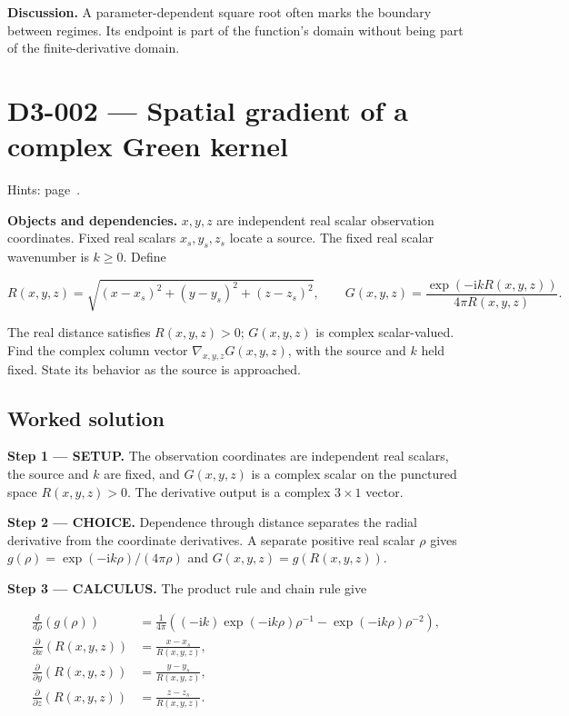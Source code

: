 \documentclass[11pt,oneside,openany]{book}
\begin{document}
\textbf{Discussion.} A parameter-dependent square root often marks the boundary between regimes. Its endpoint is part of the function's domain without being part of the finite-derivative domain.
\clearpage
\section{D3-002 --- Spatial gradient of a complex Green kernel}
\label{problem:D3-002}
{\small Hints: page~\pageref{hints:D3-002}.}\par\medskip

\textbf{Objects and dependencies.} \(x,y,z\) are independent real scalar observation coordinates. Fixed real scalars \(x_s,y_s,z_s\) locate a source. The fixed real scalar wavenumber is \(k\ge0\). Define

\[
R(x,y,z)=\sqrt{(x-x_s)^2+(y-y_s)^2+(z-z_s)^2},\qquad
G(x,y,z)=\frac{\exp(-\mathrm{i}kR(x,y,z))}{4\pi R(x,y,z)}.
\]

The real distance satisfies \(R(x,y,z)>0\); \(G(x,y,z)\) is complex scalar-valued. Find the complex column vector \(\nabla_{x,y,z}G(x,y,z)\), with the source and \(k\) held fixed. State its behavior as the source is approached.
\subsection*{Worked solution}

\textbf{Step 1 --- SETUP.} The observation coordinates are independent real scalars, the source and \(k\) are fixed, and \(G(x,y,z)\) is a complex scalar on the punctured space \(R(x,y,z)>0\). The derivative output is a complex \(3\times1\) vector.

\begin{ChoiceStep}
\textbf{Step 2 --- CHOICE.} Dependence through distance separates the radial derivative from the coordinate derivatives. A separate positive real scalar \(\rho\) gives \(g(\rho)=\exp(-\mathrm{i}k\rho)/(4\pi\rho)\) and \(G(x,y,z)=g(R(x,y,z))\).

\end{ChoiceStep}
\textbf{Step 3 --- CALCULUS.} The product rule and chain rule give

\[
\begin{aligned}
\frac{d}{d\rho}\left(g(\rho)\right)
&=\frac{1}{4\pi}\left((-\mathrm{i}k)\exp(-\mathrm{i}k\rho)\rho^{-1}-\exp(-\mathrm{i}k\rho)\rho^{-2}\right),\\
\frac{\partial}{\partial x}\left(R(x,y,z)\right)&=\frac{x-x_s}{R(x,y,z)},\\
\frac{\partial}{\partial y}\left(R(x,y,z)\right)&=\frac{y-y_s}{R(x,y,z)},\\
\frac{\partial}{\partial z}\left(R(x,y,z)\right)&=\frac{z-z_s}{R(x,y,z)}.
\end{aligned}
\]
\end{document}

